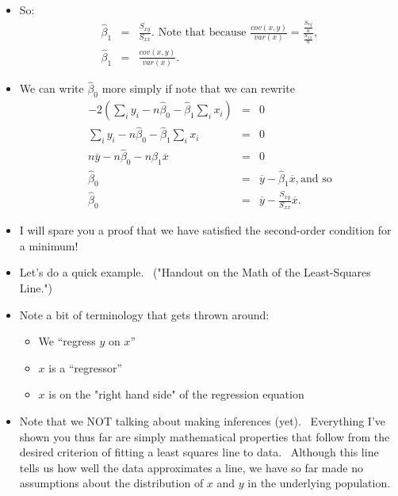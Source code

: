 \documentclass[11pt]{article}
\begin{document}
\begin{itemize}
\item So:%
\begin{eqnarray*}
\widehat{\beta }_{1} &=&\frac{S_{xy}}{S_{xx}}.\text{ \ Note that because }%
\frac{cov(x,y)}{var(x)}=\frac{\frac{S_{xy}}{n}}{\frac{S_{xx}}{n}}, \\
\widehat{\beta }_{1} &=&\frac{cov(x,y)}{var(x)}.
\end{eqnarray*}

\item We can write $\widehat{\beta }_{0}$ more simply if note that we can
rewrite%
\begin{eqnarray*}
-2\left( \sum\nolimits_{i}y_{i}-n\widehat{\beta }_{0}-\widehat{\beta }%
_{1}\sum\nolimits_{i}x_{i}\right) &=&0 \\
\sum\nolimits_{i}y_{i}-n\widehat{\beta }_{0}-\widehat{\beta }%
_{1}\sum\nolimits_{i}x_{i} &=&0 \\
n\overline{y}-n\widehat{\beta }_{0}-n\widehat{\beta }_{1}\overline{x} &=&0 \\
\widehat{\beta }_{0} &=&\overline{y}-\widehat{\beta }_{1}\overline{x},\text{
and so} \\
\widehat{\beta }_{0} &=&\overline{y}-\frac{S_{xy}}{S_{xx}}\overline{x}.
\end{eqnarray*}

\item I will spare you a proof that we have satisfied the second-order
condition for a minimum!

\item Let's do a quick example. \ ("Handout on the Math of the Least-Squares
Line.")

\item Note a bit of terminology that gets thrown around:

\begin{itemize}
\item We \textquotedblleft regress $y$ on $x$\textquotedblright

\item $x$ is a \textquotedblleft regressor\textquotedblright

\item $x$ is on the "right hand side" of the regression equation
\end{itemize}

\item Note that we NOT talking about making inferences (yet). \ Everything
I've shown you thus far are simply mathematical properties that follow from
the desired criterion of fitting a least squares line to data. \ Although
this line tells us how well the data approximates a line, we have so far
made no assumptions about the distribution of $x$ and $y$ in the underlying
population. \ 


\end{itemize}
\end{document}
